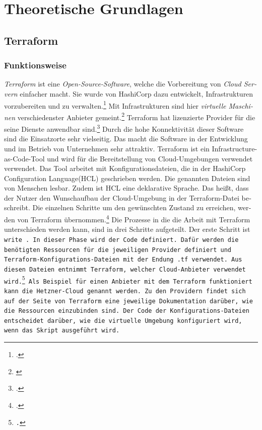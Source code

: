 \section{Theoretische Grundlagen} 
\subsection{Terraform}
\begin{otherlanguage}{ngerman}
\subsubsection{Funktionsweise}
\textit{Terraform} ist eine \textit{Open-Source-Software}, welche die Vorbereitung von \textit{Cloud Servern} einfacher macht. Sie wurde von HashiCorp dazu entwickelt, Infrastrukturen vorzubereiten und zu verwalten.\footcite{introform} Mit Infrastrukturen sind hier \textit{virtuelle Maschinen} verschiedenster Anbieter gemeint.\footnote{\cite{Terraform}} Terraform hat lizenzierte Provider für die seine Dienste anwendbar sind.\footcite{TerraProviders} Durch die hohe Konnektivität dieser Software sind die Einsatzorte sehr vielseitig. Das macht die Software in der Entwicklung und im Betrieb von Unternehmen sehr attraktiv. 
\newline
\newline
Terraform ist ein Infrastructure-as-Code-Tool und wird für die Bereitstellung von Cloud-Umgebungen verwendet verwendet. Das Tool arbeitet mit Konfigurationsdateien, die in der HashiCorp Configuration Language(HCL) geschrieben werden. Die genannten Dateien sind von Menschen lesbar. Zudem ist HCL eine deklarative Sprache. Das heißt, dass der Nutzer den Wunschaufbau der Cloud-Umgebung in der Terraform-Datei beschreibt. Die einzelnen Schritte um den gewünschten Zustand zu erreichen, werden von Terraform übernommen.\footcite{PubliTerra}
\newline
Die Prozesse in die die Arbeit mit Terraform unterschieden werden kann, sind in drei Schritte aufgeteilt. Der erste Schritt ist \tt write \rm. In dieser Phase wird der Code definiert. Dafür werden die benötigten Ressourcen für die jeweiligen Provider definiert und Terraform-Konfigurations-Dateien mit der Endung \tt .tf \rm verwendet. Aus diesen Dateien entnimmt Terraform, welcher Cloud-Anbieter verwendet wird.\footcite{TFWorkflow} Als Beispiel für einen Anbieter mit dem Terraform funktioniert kann die \dq Hetzner-Cloud \dq{} genannt werden. Zu den Providern findet sich auf der Seite von Terraform eine jeweilige Dokumentation darüber, wie die Ressourcen einzubinden sind. Der Code der Konfigurations-Dateien entscheidet darüber, wie die virtuelle Umgebung konfiguriert wird, wenn das Skript ausgeführt wird. 


\end{otherlanguage}
